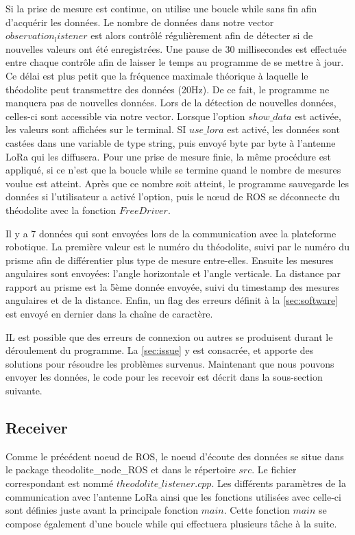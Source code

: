 \documentclass[10pt,letterpaper,oneside]{article}
\begin{document}
Si la prise de mesure est continue, on utilise une boucle while sans fin afin d'acquérir les données.
Le nombre de données dans notre vector $observation_listener$ est alors contrôlé régulièrement afin de détecter si de nouvelles valeurs ont été enregistrées.
Une pause de 30 millisecondes est effectuée entre chaque contrôle afin de laisser le temps au programme de se mettre à jour.
Ce délai est plus petit que la fréquence maximale théorique à laquelle le théodolite peut transmettre des données (20Hz).
De ce fait, le programme ne manquera pas de nouvelles données.
Lors de la détection de nouvelles données, celles-ci sont accessible via notre vector.
Lorsque l'option $show\_data$ est activée, les valeurs sont affichées sur le terminal.
SI $use\_lora$ est activé, les données sont castées dans une variable de type string, puis envoyé byte par byte à l'antenne LoRa qui les diffusera.
Pour une prise de mesure finie, la même procédure est appliqué, si ce n'est que la boucle while se termine quand le nombre de mesures voulue est atteint.
Après que ce nombre soit atteint, le programme sauvegarde les données si l'utilisateur a activé l'option, puis le nœud de ROS se déconnecte du théodolite avec la fonction $FreeDriver$.

Il y a 7 données qui sont envoyées lors de la communication avec la plateforme robotique.
La première valeur est le numéro du théodolite, suivi par le numéro du prisme afin de différentier plus type de mesure entre-elles.
Ensuite les mesures angulaires sont envoyées: l'angle horizontale et l'angle verticale.
La distance par rapport au prisme est la 5ème donnée envoyée, suivi du timestamp des mesures angulaires et de la distance.
Enfin, un flag des erreurs définit à la \autoref{sec:software} est envoyé en dernier dans la chaîne de caractère.

IL est possible que des erreurs de connexion ou autres se produisent durant le déroulement du programme.
La \autoref{sec:issue} y est consacrée, et apporte des solutions pour résoudre les problèmes survenus.
Maintenant que nous pouvons envoyer les données, le code pour les recevoir est décrit dans la sous-section suivante.

\subsection{Receiver}

Comme le précédent noeud de ROS, le noeud d'écoute des données se situe dans le package theodolite\_node\_ROS et dans le répertoire $src$.
Le fichier correspondant est nommé $theodolite\_listener.cpp$.
Les différents paramètres de la communication avec l'antenne LoRa ainsi que les fonctions utilisées avec celle-ci sont définies juste avant la principale fonction $main$.
Cette fonction $main$ se compose également d'une boucle while qui effectuera plusieurs tâche à la suite.
\end{document}
